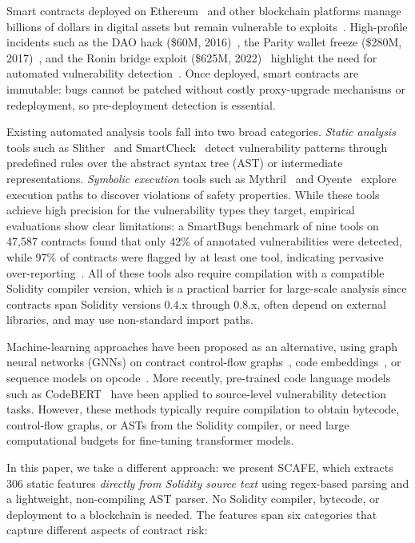\documentclass[11pt,a4paper]{article}
\newcommand{\MethodName}{SCAFE\xspace}
\begin{document}
Smart contracts deployed on Ethereum~\cite{wood2014ethereum,buterin2014next} and other blockchain platforms manage billions of dollars in digital assets but remain vulnerable to exploits~\cite{zou2019smart,praitheeshan2019security}.
High-profile incidents such as the DAO hack (\$60M, 2016)~\cite{mehar2019understanding}, the Parity wallet freeze (\$280M, 2017)~\cite{destefanis2018smart}, and the Ronin bridge exploit (\$625M, 2022)~\cite{zhou2023sok} highlight the need for automated vulnerability detection~\cite{atzei2017survey,chen2020defining}.
Once deployed, smart contracts are immutable: bugs cannot be patched without costly proxy-upgrade mechanisms or redeployment, so pre-deployment detection is essential.

Existing automated analysis tools fall into two broad categories.
\emph{Static analysis} tools such as Slither~\cite{feist2019slither} and SmartCheck~\cite{tikhomirov2018smartcheck} detect vulnerability patterns through predefined rules over the abstract syntax tree (AST) or intermediate representations.
\emph{Symbolic execution} tools such as Mythril~\cite{mueller2018smashing} and Oyente~\cite{luu2016making} explore execution paths to discover violations of safety properties.
While these tools achieve high precision for the vulnerability types they target, empirical evaluations show clear limitations: a SmartBugs benchmark of nine tools on 47,587 contracts found that only 42\% of annotated vulnerabilities were detected, while 97\% of contracts were flagged by at least one tool, indicating pervasive over-reporting~\cite{durieux2020empirical}.
All of these tools also require compilation with a compatible Solidity compiler version, which is a practical barrier for large-scale analysis since contracts span Solidity versions 0.4.x through 0.8.x, often depend on external libraries, and may use non-standard import paths.

Machine-learning approaches have been proposed as an alternative, using graph neural networks (GNNs) on contract control-flow graphs~\cite{zhuang2020smart}, code embeddings~\cite{gao2020smartembed}, or sequence models on opcode~\cite{lutz2021escort}.
More recently, pre-trained code language models such as CodeBERT~\cite{feng2020codebert} have been applied to source-level vulnerability detection tasks.
However, these methods typically require compilation to obtain bytecode, control-flow graphs, or ASTs from the Solidity compiler, or need large computational budgets for fine-tuning transformer models.

In this paper, we take a different approach: we present \MethodName, which extracts 306 static features \emph{directly from Solidity source text} using regex-based parsing and a lightweight, non-compiling AST parser.
No Solidity compiler, bytecode, or deployment to a blockchain is needed.
The features span six categories that capture different aspects of contract risk:
\end{document}
